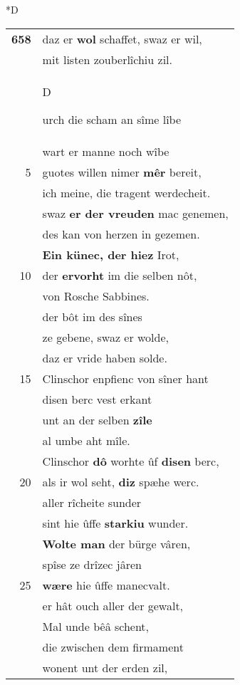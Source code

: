 \documentclass[8pt,a4paper,notitlepage]{article}
\begin{document}
\begin{table}[ht]
\begin{minipage}[t]{0.5\linewidth}
\small
\begin{center}*D
\end{center}
\begin{tabular}{rl}
\textbf{658} & daz er \textbf{wol} schaffet, swaz er wil,\\ 
 & mit listen zouberlîchiu zil.\\ 
 & \begin{large}D\end{large}urch die scham an sîme lîbe\\ 
 & wart er manne noch wîbe\\ 
5 & guotes willen nimer \textbf{mêr} bereit,\\ 
 & ich meine, die tragent werdecheit.\\ 
 & swaz \textbf{er der vreuden} mac genemen,\\ 
 & des kan von herzen in gezemen.\\ 
 & \textbf{Ein künec, der hiez} Irot,\\ 
10 & der \textbf{ervorht} im die selben nôt,\\ 
 & von Rosche Sabbines.\\ 
 & der bôt im des sînes\\ 
 & ze gebene, swaz er wolde,\\ 
 & daz er vride haben solde.\\ 
15 & Clinschor enpfienc von sîner hant\\ 
 & disen berc vest erkant\\ 
 & unt an der selben \textbf{zîle}\\ 
 & al umbe aht mîle.\\ 
 & Clinschor \textbf{dô} worhte ûf \textbf{disen} berc,\\ 
20 & als ir wol seht, \textbf{diz} spæhe werc.\\ 
 & aller rîcheite sunder\\ 
 & sint hie ûffe \textbf{starkiu} wunder.\\ 
 & \textbf{Wolte man} der bürge vâren,\\ 
 & spîse ze drîzec jâren\\ 
25 & \textbf{wære} hie ûffe manecvalt.\\ 
 & er hât ouch aller der gewalt,\\ 
 & Mal unde bêâ schent,\\ 
 & die zwischen dem firmament\\ 
 & wonent unt der erden zil,\\ 

\end{tabular}
\end{minipage}
\end{table}
\end{document}
